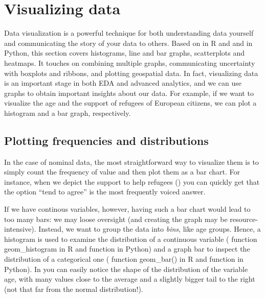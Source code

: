 \section{Visualizing data}
\label{sec:visualization}


Data visualization is a powerful technique for both understanding data yourself and communicating the story of your data to others. Based on  in R and  and  in Python, this section covers histograms, line and bar graphs, scatterplots and heatmaps. It touches on combining multiple graphs, communicating uncertainty with boxplots and ribbons, and plotting geospatial data.  In fact, visualizing data is an important stage in both EDA and advanced analytics, and we can use graphs to obtain important insights about our data. For example, if we want to visualize the age and the support of refugees of European citizens, we can plot a histogram and a bar graph, respectively. 


\subsection{Plotting frequencies and distributions}
In the case of nominal data, the most straightforward way to visualize them is to simply count the frequency of value and then plot them as a bar chart. For instance, when we depict the support to help refugees () you can quickly get that the option ``tend to agree'' is the most frequently voiced answer.


If we have continous variables, however, having such a bar chart would lead to too many bars: we may loose oversight (and creating the graph may be resource-intensive). Instead, we want to group the data into \emph{bins}, like age groups.
Hence, a histogram is used to examine the distribution of a continuous variable ( function geom\_histogram in R and  function  in Python) and a graph bar to inspect the distribution of a categorical one ( function geom\_bar() in R and  function  in Python). In  you can easily notice the shape of the distribution of the variable age, with many values close to the average and a slightly bigger tail to the right (not that far from the normal distribution!).  


